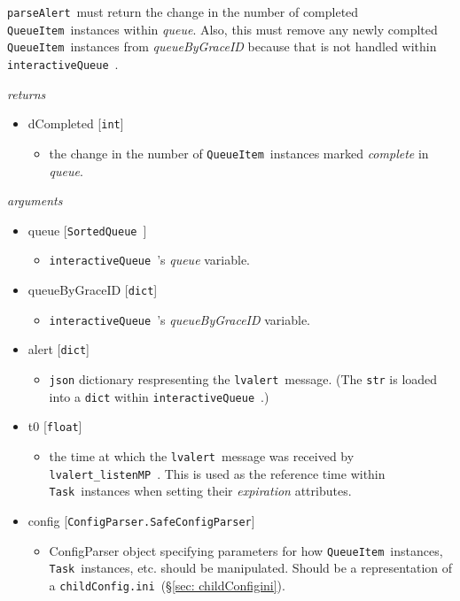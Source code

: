\documentclass{article}
\newcommand{\alert}{\texttt{lvalert}~}
\newcommand{\lvalertListenMP}{\texttt{lvalert\_listenMP}~}
\newcommand{\interactiveQueue}{\texttt{interactiveQueue}~}
\newcommand{\parseAlert}{\texttt{parseAlert}~}
\newcommand{\SortedQueue}{\texttt{SortedQueue}~}
\newcommand{\QueueItem}{\texttt{QueueItem}~}
\newcommand{\Task}{\texttt{Task}~}
\newcommand{\childConfigini}{\texttt{childConfig.ini}~}
\begin{document}
\parseAlert must return the change in the number of completed \QueueItem instances within \textit{queue}.
Also, this must remove any newly complted \QueueItem instances from \textit{queueByGraceID} because that is not handled within \interactiveQueue.

\vspace{0.5cm}
\noindent
\textit{returns}

\begin{itemize}
    \item{dCompleted [\texttt{int}]
        \begin{itemize}
            \item{the change in the number of \QueueItem instances marked \textit{complete} in \textit{queue}.}
        \end{itemize}
         }
\end{itemize}

\noindent
\textit{arguments}

\begin{itemize} 
    \item{queue [\SortedQueue]
        \begin{itemize}
            \item{\interactiveQueue's \textit{queue} variable.}
        \end{itemize}
         }
    \item{queueByGraceID [\texttt{dict}]
        \begin{itemize}
            \item{\interactiveQueue's \textit{queueByGraceID} variable.}
        \end{itemize}
         }
    \item{alert [\texttt{dict}]
        \begin{itemize}
            \item{\texttt{json} dictionary respresenting the \alert message. (The \texttt{str} is loaded into a \texttt{dict} within \interactiveQueue.)}
        \end{itemize}
         }
    \item{t0 [\texttt{float}]
        \begin{itemize}
            \item{the time at which the \alert message was received by \lvalertListenMP. This is used as the reference time within \Task instances when setting their \textit{expiration} attributes.}
        \end{itemize}
         }
    \item{config [\texttt{ConfigParser.SafeConfigParser}]
        \begin{itemize}
            \item{ConfigParser object specifying parameters for how \QueueItem instances, \Task instances, etc. should be manipulated. Should be a representation of a \childConfigini (\S\ref{sec: childConfigini}).}
        \end{itemize}
         }
\end{itemize}
\end{document}

